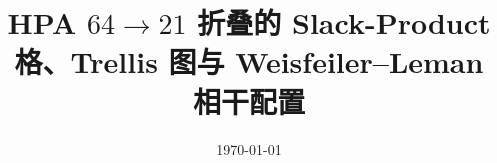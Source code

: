 \documentclass[11pt,letterpaper]{ctexart}
\title{HPA $64\to 21$ 折叠的 Slack-Product 格、Trellis 图与 Weisfeiler--Leman 相干配置}
\author{}
\date{\today}
\begin{document}
\maketitle














\FloatBarrier
\appendix


\FloatBarrier

\end{document}
